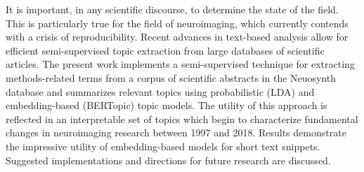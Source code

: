 It is important, in any scientific discourse, to determine the state of the field. This is particularly true for the field of neuroimaging, which currently contends with a crisis of reproducibility. Recent advances in text-based analysis allow for efficient semi-supervised topic extraction from large databases of scientific articles. The present work implements a semi-supervised technique for extracting methods-related terms from a corpus of scientific abstracts in the Neuosynth database and summarizes relevant topics using probabilistic (LDA) and embedding-based (BERTopic) topic models. The utility of this approach is reflected in an interpretable set of topics which begin to characterize fundamental changes in neuroimaging research between 1997 and 2018. Results demonstrate the impressive utility of embedding-based models for short text snippets. Suggested implementations and directions for future research are discussed.  